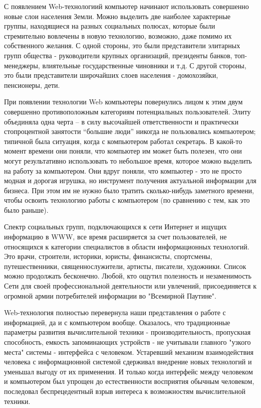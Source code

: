 С появлением Web-технологиий компьютер начинают использовать совершенно новые слои населения Земли. Можно выделить две наиболее характерные группы, находящиеся на разных социальных полюсах, которые были стремительно вовлечены в новую технологию, возможно, даже помимо их собственного желания. С одной стороны, это были представители элитарных групп общества - руководители крупных организаций, президенты банков, топ- менеджеры, влиятельные государственные чиновники и т.д. С другой стороны, это были представители широчайших слоев населения - домохозяйки, пенсионеры, дети.

При появлении технологии Web компьютеры повернулись лицом к этим двум совершенно противоположным категориям потенциальных пользователей. Элиту объединяла одна черта – в силу высочайшей ответственности и практически стопроцентной занятости “большие люди” никогда не пользовались компьютером; типичной была ситуация, когда с компьютером работал секретарь. В какой-то момент времени они поняли, что компьютер им может быть полезен, что они могут результативно использовать то небольшое время, которое можно выделить на работу за компьютером. Они вдруг поняли, что компьютер - это не просто модная и дорогая игрушка, но инструмент получения актуальной информации для бизнеса. При этом им не нужно было тратить сколько-нибудь заметного времени, чтобы освоить технологию работы с компьютером (по сравнению с тем, как это было раньше).

Спектр социальных групп, подключающихся к сети Интернет и ищущих информацию в WWW, все время расширяется за счет пользователей, не относящихся к категории специалистов в области информационных технологий. Это врачи, строители, историки, юристы, финансисты, спортсмены, путешественники, священнослужители, артисты, писатели, художники. Список можно продолжать бесконечно. Любой, кто ощутил полезность и незаменимость Сети для своей профессиональной деятельности или увлечений, присоединяется к огромной армии потребителей информации во "Всемирной Паутине".

Web-технология полностью перевернула наши представления о работе с информацией, да и с компьютером вообще. Оказалось, что традиционные параметры развития вычислительной техники - производительность, пропускная способность, емкость запоминающих устройств - не учитывали главного "узкого места" системы - интерфейса с человеком. Устаревший механизм взаимодействия человека с информационной системой сдерживал внедрение новых технологий и уменьшал выгоду от их применения. И только когда интерфейс между человеком и компьютером был упрощен до естественности восприятия обычным человеком, последовал беспрецедентный взрыв интереса к возможностям вычислительной техники.

